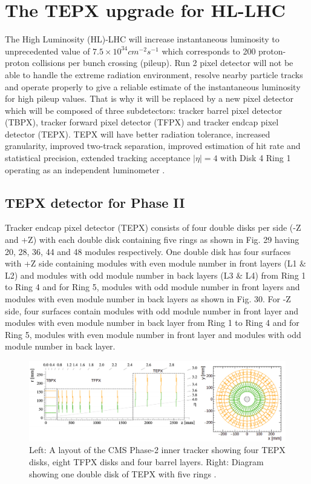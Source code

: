 \section{The TEPX upgrade for HL-LHC}
\label{sec:tepx}

The High Luminosity (HL)-LHC will increase instantaneous luminosity to unprecedented value of $7.5 \times 10^{34} cm^{-2} s^{-1}$ which corresponds to 200 proton-proton collisions per bunch crossing (pileup). Run 2 pixel detector will not be able to handle the extreme radiation environment, resolve nearby particle tracks and operate properly to give a reliable estimate of the instantaneous luminosity for high pileup values. That is why it will be replaced by a new pixel detector which will be composed of three subdetectors: tracker barrel pixel detector (TBPX), tracker forward pixel detector (TFPX) and tracker endcap pixel detector (TEPX). TEPX will have better radiation tolerance, increased granularity, improved two-track separation, improved estimation of hit rate and statistical precision, extended tracking acceptance $|\eta|=4$ with Disk 4 Ring 1 operating as an independent luminometer \cite{Klein:2017nke}. \\


\subsection{TEPX detector for Phase II}

Tracker endcap pixel detector (TEPX) consists of four double disks per side (-Z and +Z) with each double disk containing five rings as shown in Fig. 29 having 20, 28, 36, 44 and 48 modules respectively. One double disk has four surfaces with +Z side containing modules with even module number in front layers (L1 $\&$ L2) and modules with odd module number in back layers (L3 $\&$ L4) from Ring 1 to Ring 4 and for Ring 5, modules with odd module number in front layers and modules with even module number in back layers as shown in Fig. 30. For -Z side, four surfaces contain modules with odd module number in front layer and modules with even module number in back layer from Ring 1 to Ring 4 and for Ring 5, modules with even module number in front layer and modules with odd module number in back layer. \\


\begin{figure}[H]
  \centering
  \includegraphics[width=1 \columnwidth]{./tepx_tt.png}
  \caption{ \onehalfspacing Left: A layout of the CMS Phase-2 inner tracker showing four TEPX disks, eight TFPX disks and four barrel layers. Right: Diagram showing one double disk of TEPX with five rings \cite{Klein:2017nke}.}
  \label{fig:CMS}
\end{figure}


